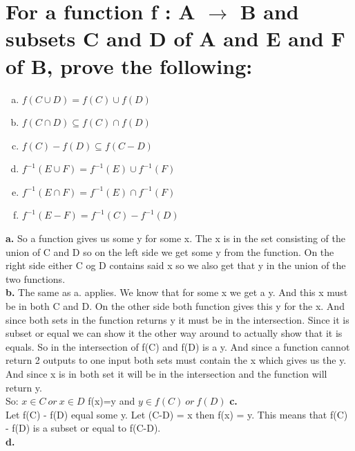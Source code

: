 \section{For a function f : A $\rightarrow$ B and subsets C and D of A and E and F of B, prove the following:}
\begin{enumerate}[a.]
\item $f(C \cup D) = f(C) \cup f(D)$
\item $f(C \cap D) \subseteq f(C) \cap f(D)$
\item $f(C) - f(D) \subseteq f(C-D)$
\item $f^{-1}(E \cup F) = f^{-1}(E) \cup f^{-1}(F)$
\item $f^{-1}(E \cap F) = f^{-1}(E) \cap f^{-1}(F)$
\item $f^{-1}(E - F) = f^{-1}(C) - f^{-1}(D)$
\end{enumerate}
\textbf{a.} So a function gives us some y for some x. The x is in the set consisting of the union of C and D so on the left side we get some y from the function. On the right side either C og D contains said x so we also get that y in the union of the two functions.\\
\textbf{b.} The same as a. applies. We know that for some x we get a y. And this x must be in both C and D. On the other side both function gives this y for the x. And since both sets in the function returns y it must be in the intersection. Since it is subset or equal we can show it the other way around to actually show that it is equals. So in the intersection of f(C) and f(D) is a y. And since a function cannot return 2 outputs to one input both sets must contain the x which gives us the y. And since x is in both set it will be in the intersection and the function will return y.\\
So: $x\in C \ or\ x \in D$ f(x)=y and $y\in f(C)\ or\ f(D)$
\textbf{c.}\\
Let f(C) - f(D) equal some y. Let (C-D) = x then f(x) = y. This means that f(C) - f(D) is a subset or equal to f(C-D).\\
\textbf{d.}\\

\newpage
